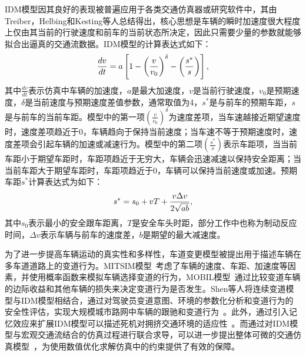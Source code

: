 IDM模型因其良好的表现被普遍应用于各类交通仿真器或研究软件中，其由Treiber，Helbing和Kesting等人总结得出，核心思想是车辆的瞬时加速度很大程度上仅由其当前的行驶速度和前车的当前状态所决定，因此只需要少量的参数就能够拟合出逼真的交通流数据。IDM模型的计算表达式如下：
\begin{equation}
\setlength\abovedisplayskip{10pt}
\setlength\belowdisplayskip{10pt}
\label{eq:intro_idm}
    \frac{dv}{dt} = a \left[ 1 - \left(\frac{v}{v_0} \right)^\delta - \left( \frac{s^*}{s} \right) \right],
\end{equation}
其中$\frac{dv}{dt}$表示仿真中车辆的加速度，$a$是最大加速度，$v$是当前行驶速度，$v_0$是预期速度，$\delta$是当前速度与预期速度差值参数，通常取值为4，$s^*$是与前车的预期车距，$s$是与前车的当前车距。模型中的第一项$\left(\frac{v}{v_0} \right)^\delta$为速度差项，当车速越接近期望速度时，速度差项趋近于0，车辆趋向于保持当前速度；当车速不等于预期速度时，速度差项会引起车辆的加速或减速行为。模型中的第二项$\left( \frac{s^*}{s} \right)$表示车距项，当当前车距小于期望车距时，车距项趋近于无穷大，车辆会迅速减速以保持安全距离；当当前车距大于期望车距时，车距项趋近于0，车辆可以保持当前速度或加速。预期车距$s^*$计算表达式为如下：
\begin{equation}
\setlength\abovedisplayskip{10pt}
\setlength\belowdisplayskip{10pt}
\label{eq:intro_idm2}
    s^* = s_0 + vT + \frac{v\Delta{v}}{2\sqrt{ab}},
\end{equation}
其中$s_0$表示最小的安全跟车距离，$T$是安全车头时距，部分工作中也称为制动反应时间，$\Delta{v}$表示车辆与前车的速度差，$b$是期望的最大减速度。


为了进一步提高车辆运动的真实性和多样性，车道变更模型被提出用于描述车辆在多车道道路上的变道行为。MITSIM模型~\cite{yang1996mitsim}考虑了车辆的速度、车距、加速度等因素，并使用概率函数来模拟车辆选择变道的行为，MOBIL模型~\cite{kesting2007general}通过比较变道车辆的边际收益和其他车辆的损失来决定变道行为是否发生。Shen等人将连续变道模型与IDM模型相结合，通过对驾驶员变道意图、环境的参数化分析和变道行为的安全性评估，实现大规模城市路网中车辆的跟驰和变道行为~\cite{shen2012detailed}。此外，通过引入记忆效应来扩展IDM模型可以描述死机对拥挤交通环境的适应性~\cite{treiber2003memory}。而通过对IDM模型与宏观交通流结合的仿真过程进行联合求导，可以进一步提出整体可微的交通仿真模型~\cite{son2022differentiable}，为使用数值优化求解仿真中的约束提供了有效的保障。




